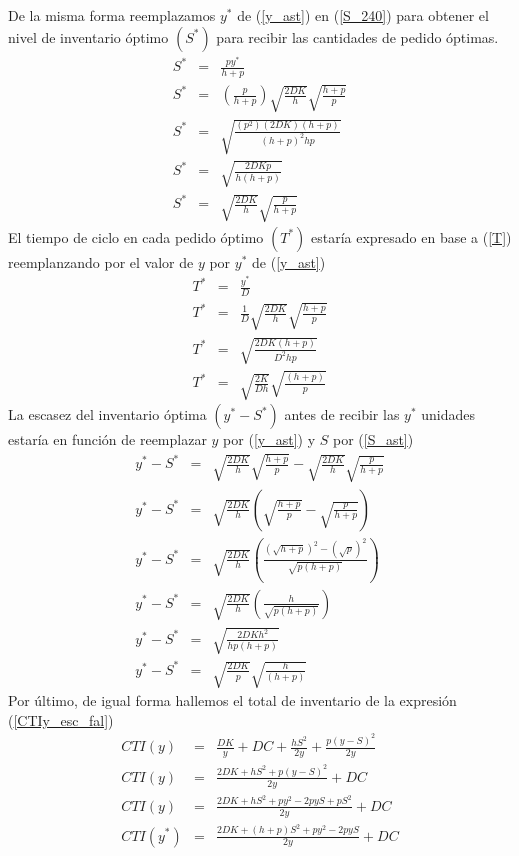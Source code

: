 De la misma forma reemplazamos $y^*$ de (\ref{y_ast}) en (\ref{S_240}) para obtener el nivel de inventario óptimo $(S^*)$ para recibir las cantidades de pedido óptimas.
\begin{eqnarray}
	\label{S_ast}
	S^* &=& \frac{py^*}{h+p} \nonumber \\
	S^* &=& \left(\frac{p}{h+p} \right) \sqrt{\frac{2DK}{h}} \sqrt{\frac{h+p}{p}} \nonumber \\
	S^* &=& \sqrt{\frac{(p^2)(2DK)(h+p)}{{(h+p)}^{2}hp}} \nonumber \\
	S^* &=& \sqrt{\frac{2DKp}{h(h+p)}} \nonumber \\
	S^* &=& \sqrt{\frac{2DK}{h}}\sqrt{\frac{p}{h+p}}
\end{eqnarray}
El tiempo de ciclo en cada pedido óptimo $(T^*)$ estaría expresado en base a (\ref{T}) reemplanzando por el valor de $y$ por $y^*$ de (\ref{y_ast})
\newpage
\begin{eqnarray}
	T^* &=& \frac{y^*}{D} \nonumber \\
	T^* &=& \frac{1}{D} \sqrt{\frac{2DK}{h}} \sqrt{\frac{h+p}{p}} \nonumber \\
	T^* &=& \sqrt{\frac{2DK(h+p)}{D^2 hp}} \nonumber \\
	T^* &=& \sqrt{\frac{2K}{Dh}} \sqrt{\frac{(h+p)}{p}}
\end{eqnarray}
La escasez del inventario óptima $(y^* - S^*)$ antes de recibir las $y^*$ unidades estaría en función de reemplazar $y$ por (\ref{y_ast}) y $S$ por (\ref{S_ast})
\begin{eqnarray}
	y^* - S^* &=& \sqrt{\frac{2DK}{h}} \sqrt{\frac{h+p}{p}} - \sqrt{\frac{2DK}{h}}\sqrt{\frac{p}{h+p}} \nonumber \\
	y^* - S^* &=& \sqrt{\frac{2DK}{h}} \left( \sqrt{\frac{h+p}{p}} - \sqrt{\frac{p}{h+p}} \right) \nonumber \\
	y^* - S^* &=& \sqrt{\frac{2DK}{h}} \left( \frac{{(\sqrt{h+p})}^{2} - {(\sqrt{p})}^{2}}{\sqrt{p(h+p)}}  \right) \nonumber \\
	y^* - S^* &=& \sqrt{\frac{2DK}{h}} \left( \frac{h}{\sqrt{p(h+p)}}  \right) \nonumber \\
	y^* - S^* &=& \sqrt{\frac{2DKh^2}{hp(h+p)}} \nonumber \\
	y^* - S^* &=& \sqrt{\frac{2DK}{p}} \sqrt{\frac{h}{(h+p)}}
\end{eqnarray}
Por último, de igual forma hallemos el total de inventario de la expresión (\ref{CTIy_esc_fal})
\begin{eqnarray}
	\label{CTI_escasezz}
	CTI(y) &=& \frac{DK}{y} + DC + \frac{hS^2}{2y}+\frac{p{(y-S)}^{2}}{2y} \nonumber \\
	CTI(y) &=& \frac{2DK + hS^2 + p{(y-S)}^{2}}{2y} + DC \nonumber \\
	CTI(y) &=& \frac{2DK + hS^2 + py^2 - 2pyS + pS^2}{2y} + DC \nonumber \\
	CTI(y^*) &=& \frac{2DK + (h+p){S}^{2} + p{y}^{2} - 2pyS}{2y} + DC
\end{eqnarray}
